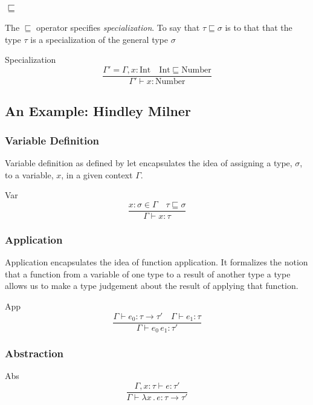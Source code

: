 \documentclass{beamer}
\begin{document}
\begin{frame}
  \frametitle{$\sqsubseteq$}
  The $\sqsubseteq$ operator specifies \emph{specialization}.  To say
  that $\tau \sqsubseteq \sigma$ is to that that the type $\tau$ is a
  specialization of the general type $\sigma$
  \begin{exampleblock}{Specialization}
    \[
      \frac{\Gamma' = \Gamma, x : \text{Int} \quad \text{Int} \sqsubseteq \text{Number}}
      {\Gamma' \vdash x : \text{Number} }
    \]
  \end{exampleblock}
\end{frame}

\subsection{An Example: Hindley Milner}

\begin{frame}
  \frametitle{Variable Definition}
  Variable definition as defined by let encapsulates the idea of
  assigning a type, $\sigma$, to a variable, $x$, in a given context
  $\Gamma$.

  \begin{exampleblock}{Var}
    \[
      \frac{x:\sigma \in \Gamma \quad \tau \sqsubseteq \sigma}{\Gamma \vdash x : \tau}
    \]
  \end{exampleblock}
\end{frame}

\begin{frame}
  \frametitle{Application}
  Application encapsulates the idea of function application. It
  formalizes the notion that a function from a variable of one type to
  a result of another type a type allows us to make a type judgement
  about the result of applying that function.
  \begin{exampleblock}{App}
    \[
      \frac{\Gamma \vdash e_0 : \tau \rightarrow \tau' \quad \Gamma \vdash e_1 : \tau}
      {\Gamma \vdash e_0\, e_1 : \tau'}
    \]
  \end{exampleblock}
\end{frame}

\begin{frame}
  \frametitle{Abstraction}
  \begin{exampleblock}{Abs}
    \[
      \frac{\Gamma, x : \tau \vdash e : \tau'}
      {\Gamma \vdash \lambda x\, .\, e : \tau \rightarrow \tau'}
    \]
  \end{exampleblock}
\end{frame}
\end{document}
